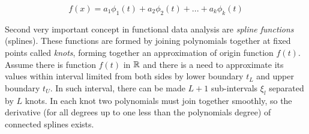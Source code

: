 \documentclass[energies,article,submit,pdftex,moreauthors]{Definitions/mdpi}
\begin{document}
\begin{linenomath}
\begin{equation}
f(x) = a_1 \phi_1(t) + a_2 \phi_2(t) + ... + a_k \phi_k(t)
\end{equation}
\end{linenomath}

Second very important concept in functional data analysis are \emph{spline functions} (splines). These functions are formed by joining polynomials together at fixed points called \emph{knots}, forming together an approximation of origin function $ f(t) $. Assume there is function $ f(t) $ in $ {\Bbb R} $ and there is a need to approximate its values within interval limited from both sides by lower boundary $ t_L $ and upper boundary $ t_U $. In such interval, there can be made $ L+1 $ sub-intervals $ \xi_l $ separated by $ L $ knots. In each knot two polynomials must join together smoothly, so the derivative (for all degrees up to one less than the polynomials degree) of connected splines exists.
\end{document}
